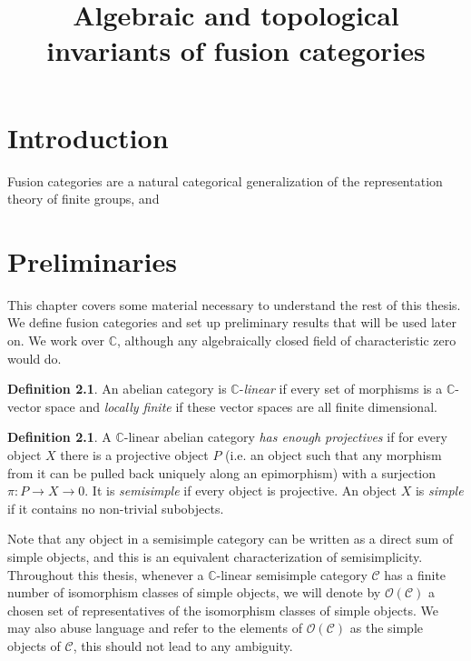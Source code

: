 \documentclass[11pt]{book}
\title{Algebraic and topological invariants of fusion categories}
\theoremstyle{Rem}
\theoremstyle{definition}
\newtheorem{Def}[theorem]{Definition}
\numberwithin{equation}{section}
\newcommand\kk{\mathbb C}
\newcommand\C{\mathcal C}
\newcommand\OO{\mathcal O}
\begin{document}
\maketitle
\tableofcontents
\chapter{Introduction}
Fusion categories are a natural categorical generalization of the representation theory of finite groups, and 
\chapter{Preliminaries}


This chapter covers some material necessary to understand the rest of this thesis. We define fusion categories and set up preliminary results that will be used later on.
We work over $\kk$, although any algebraically closed field of characteristic zero would do.

\begin{Def}
An abelian category  is $\kk$-\textit{linear} if every set of morphisms is a  $\kk$-vector space and \textit{locally finite} if these vector spaces are all finite dimensional.
\end{Def}

\begin{Def}
A $\kk$-linear abelian category \textit{ has enough projectives} if for every object $X$ there is a projective object $P$ (i.e. an object such that any morphism from it can be pulled back uniquely along an epimorphism) with a surjection $\pi:P\rightarrow X\rightarrow 0$. It is \textit{semisimple} if every object is projective. An object $X$ is \textit{simple} if it contains no non-trivial subobjects.
\end{Def}


 Note that any object in a semisimple category can be written as a direct sum of simple objects, and this is an equivalent characterization of semisimplicity. Throughout this thesis, whenever a $\kk$-linear semisimple category $\C$ has a finite number of isomorphism classes of simple objects, we will denote by $\OO(\C)$ a chosen set of representatives of the isomorphism classes of simple objects. We may also abuse language and refer to the elements of $\OO(\C)$ as the simple objects of $\C$, this should not lead to any ambiguity.
\end{document}
